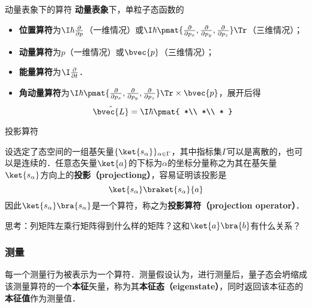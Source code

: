 \begin{example}{动量表象下的算符}
\textbf{动量表象}下，单粒子态函数的
\begin{itemize}
\item \textbf{位置算符}为$\I\hbar\frac{\partial}{\partial p}$（一维情况）或$\I\hbar\pmat{\frac{\partial}{\partial p_x}, \frac{\partial}{\partial p_y}, \frac{\partial}{\partial p_z}}\Tr$（三维情况）；
\item \textbf{动量算符}为$p$（一维情况）或$\bvec{p}$（三维情况）；
\item \textbf{能量算符}为$\I \frac{\partial}{\partial t}$．
\item \textbf{角动量算符}为$\I\hbar\pmat{\frac{\partial}{\partial p_x}, \frac{\partial}{\partial p_y}, \frac{\partial}{\partial p_z}}\Tr\times \bvec{p}$，展开后得
\begin{equation}
\hat{\bvec{L}}=
\I\hbar
\pmat{
    *\\
    *\\
    *
}
\end{equation}
\end{itemize}
\end{example}





\begin{example}{投影算符}

设选定了态空间的一组基矢量$\{\ket{s_\alpha}\}_{\alpha\in \Gamma}$，其中指标集$\Gamma$可以是离散的，也可以是连续的．任意态矢量$\ket{a}$的下标为$\alpha$的坐标分量称之为其在基矢量$\ket{s_\alpha}$方向上的\textbf{投影（projectiong）}，容易证明该投影是
\begin{equation}
\ket{s_\alpha}\braket{s_\alpha}{a}
\end{equation}
因此$\ket{s_\alpha}\bra{s_\alpha}$是一个算符，称之为\textbf{投影算符（projection operator）}．

思考：列矩阵左乘行矩阵得到什么样的矩阵？这和$\ket{a}\bra{b}$有什么关系？

\end{example}



\subsubsection{测量}

每一个测量行为被表示为一个算符．测量假设认为，进行测量后，量子态会坍缩成该测量算符的一个\textbf{本征}矢量，称为其\textbf{本征态（eigenstate）}，同时返回该本征态的\textbf{本征值}作为测量值．

